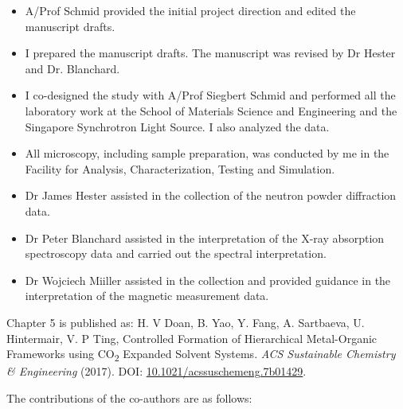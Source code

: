 \begin{itemize}
    \setlength\parskip{0pt} %
    \item \textcolor{DeepGreen}{A/Prof Schmid provided the initial project direction and edited the manuscript drafts.}
    \item \textcolor{DeepGreen}{I prepared the manuscript drafts. The manuscript was revised by Dr Hester and Dr. Blanchard.}
    \item \textcolor{DeepGreen}{I co-designed the study with A/Prof Siegbert Schmid and performed all the laboratory work at the School of Materials Science and Engineering and the Singapore Synchrotron Light Source. I also analyzed the data.}
    \item \textcolor{DeepGreen}{All microscopy, including sample preparation, was conducted by me in the Facility for Analysis, Characterization, Testing and Simulation.}
    \item \textcolor{DeepGreen}{Dr James Hester assisted in the collection of the neutron powder diffraction data.}
    \item \textcolor{DeepGreen}{Dr Peter Blanchard assisted in the interpretation of the X-ray absorption spectroscopy data and carried out the spectral interpretation.}
    \item \textcolor{DeepGreen}{Dr Wojciech Miiller assisted in the collection and provided guidance in the interpretation of the magnetic measurement data.}
\end{itemize}


Chapter 5 is published as:
\textcolor{DeepGreen}{
H. V Doan, B. Yao, Y. Fang, A. Sartbaeva, U. Hintermair, V. P Ting, Controlled Formation of Hierarchical Metal-Organic Frameworks using CO\textsubscript{2} Expanded Solvent Systems. \textit{ACS Sustainable Chemistry \& Engineering} (2017). DOI: \href{https://doi.org/10.1021/acssuschemeng.7b01429}{10.1021/acssuschemeng.7b01429}.
}

\vspace{1cm}

The contributions of the co-authors are as follows:

